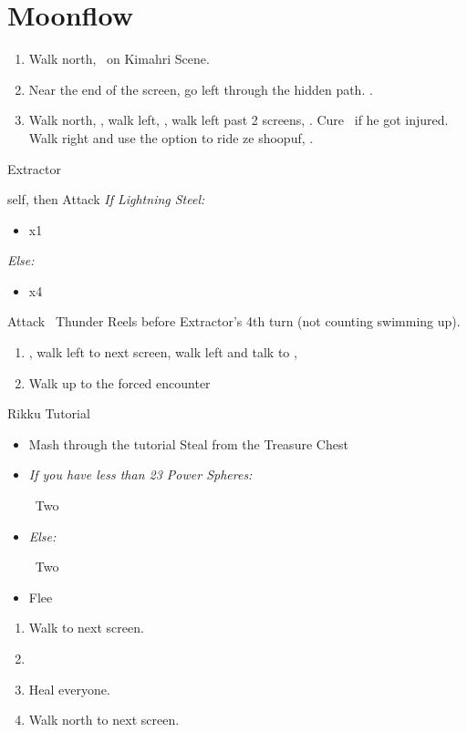\chapter{Moonflow}

\begin{enumerate}
	\item Walk north, \sd\ on Kimahri Scene.
	\item Near the end of the screen, go left through the hidden path. .
	\item Walk north, \sd, walk left, \sd, walk left past 2 screens, \sd. Cure \tidus\ if he got injured. Walk right and use the  option to ride ze shoopuf, \sd.
\end{enumerate}
\bothvfill\winvfill\lossvfill
\begin{battle}[4000]{Extractor}
	\begin{itemize}
		\tidusf \haste{} self, then \wakka
		\wakkaf Attack
		\tidusf \textit{If Lightning Steel:}
		\begin{itemize}
			\item \cheer{} x1
		\end{itemize}
		\textit{Else:}
		\begin{itemize}
			\item \cheer{} x4
		\end{itemize}
		\tidusf Attack
		\wakkaf \od\ Thunder Reels before Extractor's 4th turn (not counting swimming up).

	\end{itemize}
\end{battle}
\begin{enumerate}[resume]
	\item \sd, walk left to next screen, walk left and talk to \rikku, \sd
	\item Walk up to the forced encounter
\end{enumerate}
\begin{battle}{Rikku Tutorial}
	\begin{itemize}
		\item Mash through the tutorial
		\rikkuf Steal from the Treasure Chest
		\item \textit{If you have less than 23 Power Spheres:}
		      \begin{itemize}
			      \rikkuf \od\ Two \abilitysphere
		      \end{itemize}
		\item \textit{Else:}
		      \begin{itemize}
			      \rikkuf \od\ Two \potion
		      \end{itemize}
		\item Flee
	\end{itemize}
\end{battle}
\begin{enumerate}[resume]
	\item Walk to next screen.
	\item \formation{\tidus}{\wakka}{\auron}
	\item Heal everyone.
	\item Walk north to next screen.
\end{enumerate}